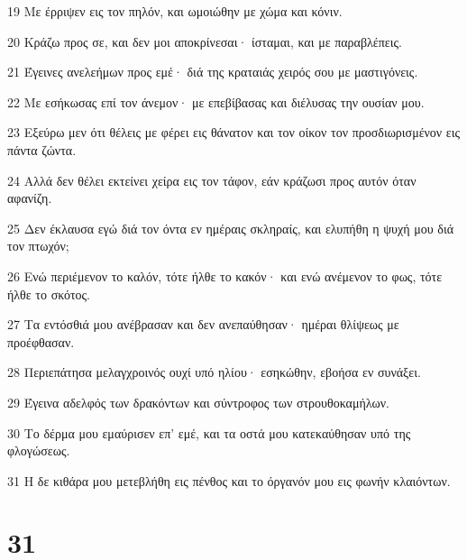 \par 19 Με έρριψεν εις τον πηλόν, και ωμοιώθην με χώμα και κόνιν.
\par 20 Κράζω προς σε, και δεν μοι αποκρίνεσαι· ίσταμαι, και με παραβλέπεις.
\par 21 Έγεινες ανελεήμων προς εμέ· διά της κραταιάς χειρός σου με μαστιγόνεις.
\par 22 Με εσήκωσας επί τον άνεμον· με επεβίβασας και διέλυσας την ουσίαν μου.
\par 23 Εξεύρω μεν ότι θέλεις με φέρει εις θάνατον και τον οίκον τον προσδιωρισμένον εις πάντα ζώντα.
\par 24 Αλλά δεν θέλει εκτείνει χείρα εις τον τάφον, εάν κράζωσι προς αυτόν όταν αφανίζη.
\par 25 Δεν έκλαυσα εγώ διά τον όντα εν ημέραις σκληραίς, και ελυπήθη η ψυχή μου διά τον πτωχόν;
\par 26 Ενώ περιέμενον το καλόν, τότε ήλθε το κακόν· και ενώ ανέμενον το φως, τότε ήλθε το σκότος.
\par 27 Τα εντόσθιά μου ανέβρασαν και δεν ανεπαύθησαν· ημέραι θλίψεως με προέφθασαν.
\par 28 Περιεπάτησα μελαγχροινός ουχί υπό ηλίου· εσηκώθην, εβοήσα εν συνάξει.
\par 29 Έγεινα αδελφός των δρακόντων και σύντροφος των στρουθοκαμήλων.
\par 30 Το δέρμα μου εμαύρισεν επ' εμέ, και τα οστά μου κατεκαύθησαν υπό της φλογώσεως.
\par 31 Η δε κιθάρα μου μετεβλήθη εις πένθος και το όργανόν μου εις φωνήν κλαιόντων.

\chapter{31}

